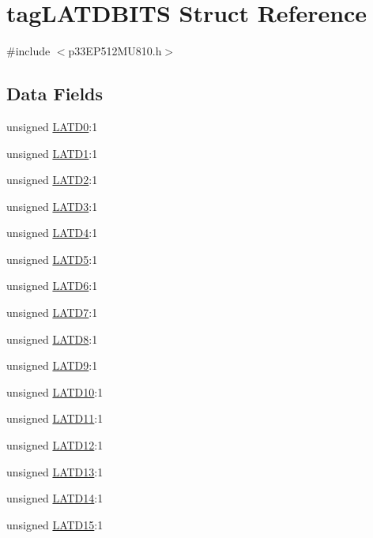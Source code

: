\hypertarget{structtag_l_a_t_d_b_i_t_s}{}\section{tag\+L\+A\+T\+D\+B\+I\+TS Struct Reference}
\label{structtag_l_a_t_d_b_i_t_s}


{\ttfamily \#include $<$p33\+E\+P512\+M\+U810.\+h$>$}

\subsection*{Data Fields}
\begin{DoxyCompactItemize}
\item 
unsigned \hyperlink{structtag_l_a_t_d_b_i_t_s_a3f4a63c62d2950aee9213b67ea17432d}{L\+A\+T\+D0}\+:1
\item 
unsigned \hyperlink{structtag_l_a_t_d_b_i_t_s_a34d889d674ac392ea95c63d29b3e4252}{L\+A\+T\+D1}\+:1
\item 
unsigned \hyperlink{structtag_l_a_t_d_b_i_t_s_adc54e366f4e7be344088482ec4c1e0c9}{L\+A\+T\+D2}\+:1
\item 
unsigned \hyperlink{structtag_l_a_t_d_b_i_t_s_a0023828564d9bb9f433a833399a2df15}{L\+A\+T\+D3}\+:1
\item 
unsigned \hyperlink{structtag_l_a_t_d_b_i_t_s_add23960d57e5315be05cac5860c8cc30}{L\+A\+T\+D4}\+:1
\item 
unsigned \hyperlink{structtag_l_a_t_d_b_i_t_s_a1cef346229e6bf6c3373e3368dc5f0d8}{L\+A\+T\+D5}\+:1
\item 
unsigned \hyperlink{structtag_l_a_t_d_b_i_t_s_a23e9fe369d39a1ce5a9f8fc6e221fc7b}{L\+A\+T\+D6}\+:1
\item 
unsigned \hyperlink{structtag_l_a_t_d_b_i_t_s_a60f7e492878d1ee2bcb037b5c41139fd}{L\+A\+T\+D7}\+:1
\item 
unsigned \hyperlink{structtag_l_a_t_d_b_i_t_s_ab7e504cbf4761d1908eac20811bad7d7}{L\+A\+T\+D8}\+:1
\item 
unsigned \hyperlink{structtag_l_a_t_d_b_i_t_s_a68dcb496990abb2e8c4a445505ef899b}{L\+A\+T\+D9}\+:1
\item 
unsigned \hyperlink{structtag_l_a_t_d_b_i_t_s_ad0625e2a5ad45f29b942e94a559e2866}{L\+A\+T\+D10}\+:1
\item 
unsigned \hyperlink{structtag_l_a_t_d_b_i_t_s_a663a55ab7e33c7291f2e4ce484425dcc}{L\+A\+T\+D11}\+:1
\item 
unsigned \hyperlink{structtag_l_a_t_d_b_i_t_s_a8db438b6ebe6382e61d4071890182fe0}{L\+A\+T\+D12}\+:1
\item 
unsigned \hyperlink{structtag_l_a_t_d_b_i_t_s_a0a21429d3d53656dd5e05a48d73b8eba}{L\+A\+T\+D13}\+:1
\item 
unsigned \hyperlink{structtag_l_a_t_d_b_i_t_s_aaf1093fceea1a4bfdd790c586413ecf6}{L\+A\+T\+D14}\+:1
\item 
unsigned \hyperlink{structtag_l_a_t_d_b_i_t_s_a531e493dbeb253535e29623f361cd842}{L\+A\+T\+D15}\+:1
\end{DoxyCompactItemize}


